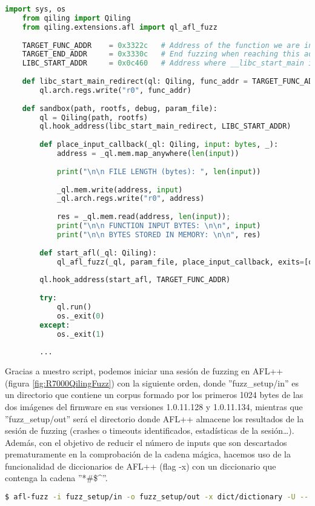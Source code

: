 \begin{lstlisting}[language=python, caption=Script de fuzzing de UPNP para Qiling., captionpos=b,
    frame=single, breaklines, showstringspaces=false]
    import sys, os
    from qiling import Qiling
    from qiling.extensions.afl import ql_afl_fuzz
    
    TARGET_FUNC_ADDR    = 0x3322c   # Address of the function we are interested in
    TARGET_END_ADDR     = 0x3330c   # End fuzzing when reaching this address
    LIBC_START_ADDR     = 0x0c460   # Address where __libc_start_main is being called
        
    def libc_start_main_redirect(ql: Qiling, func_addr = TARGET_FUNC_ADDR):
        ql.arch.regs.write("r0", func_addr)
        
    def sandbox(path, rootfs, debug, param_file):
        ql = Qiling(path, rootfs)
        ql.hook_address(libc_start_main_redirect, LIBC_START_ADDR)
        
        def place_input_callback(_ql: Qiling, input: bytes, _):
            address = _ql.mem.map_anywhere(len(input))
            
            print("\n\n FILE LENGTH (bytes): ", len(input))
            
            _ql.mem.write(address, input)
            _ql.arch.regs.write("r0", address)
            
            res = _ql.mem.read(address, len(input));
            print("\n\n FUNCTION INPUT BYTES: \n\n", input)
            print("\n\n BYTES STORED IN MEMORY: \n\n", res)
            
        def start_afl(_ql: Qiling):
            ql_afl_fuzz(_ql, param_file, place_input_callback, exits=[ql.os.exit_point])
        
        ql.hook_address(start_afl, TARGET_FUNC_ADDR)
    
        try:
            ql.run()
            os._exit(0)
        except:
            os._exit(1)
        
        ...
\end{lstlisting}

Gracias a nuestro script, podemos iniciar una sesión de fuzzing en AFL++ (figura \ref{fig:R7000QilingFuzz}) con la siguiente orden, donde ''fuzz\_setup/in''
es un directorio que contiene un corpus formado por los primeros 1024 bytes de las dos imágenes del firmware en sus versiones 1.0.11.128 y 1.0.11.134,
mientras que ''fuzz\_setup/out'' será el directorio donde AFL++ almacene los resultados de la sesión de fuzzing (crashes o timeouts identificados, estadísticas de 
la sesión\dots). Además, con el objetivo de reducir el número de inputs que son descartados prematuramente en la comprobación de la cadena mágica, 
hacemos uso de la funcionalidad de diccionarios de AFL++ (flag -x) con un diccionario que contenga la cadena ''*\#\$\textasciicircum''.
\begin{lstlisting}[language=bash, breaklines]
    $ afl-fuzz -i fuzz_setup/in -o fuzz_setup/out -x dict/dictionary -U -- python3 ./src/dev/fuzz.py @@
\end{lstlisting}

